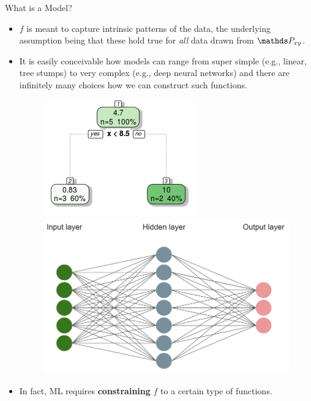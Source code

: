 \documentclass[11pt,compress,t,notes=noshow, xcolor=table]{beamer}
\begin{document}
\begin{vbframe}{What is a Model?}
\framebreak

\begin{itemize}

  \item $f$ is meant to capture intrinsic patterns of the data, the
  underlying assumption being that these hold true for \emph{all} data drawn 
  from $\Pxy$.
  
  \item It is easily conceivable how models can range from super simple (e.g., 
   linear, tree stumps) to very complex (e.g., deep neural networks) and there
   are infinitely many choices how we can construct such functions.
  
  \begin{figure}
  \begin{minipage}{0.4\textwidth}
    \centering
    \includegraphics[width=0.8\linewidth]{figure_man/monotone_trafo1.png}
  \end{minipage}%
  \begin{minipage}{0.6\textwidth}
    \centering
    \includegraphics[width=0.8\linewidth]{figure_man/network.PNG}
  \end{minipage}
  \end{figure}
  
  \vspace{0.2cm}
  
  \item In fact, ML requires \textbf{constraining} $f$ to a   certain type of functions.

\end{itemize}

\end{vbframe}
\end{document}
